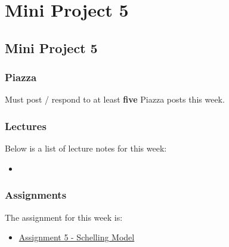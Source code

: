 \clearpage

\renewcommand{\ChapTitle}{Mini Project 5}
\renewcommand{\SectionTitle}{Mini Project 5}

\chapter{\ChapTitle}
\section{\SectionTitle}

\subsection{Piazza}

Must post / respond to at least \textbf{five} Piazza posts this week.

\subsection{Lectures}

\noindent Below is a list of lecture notes for this week:

\begin{itemize}
    \item {}
\end{itemize}

\subsection{Assignments}

The assignment for this week is:

\begin{itemize}
    \item \href{https://github.com/QuantumCompiler/CU/tree/main/CSPB%203702%20-%20Cognitive%20Science/Assignments/Assignment%205%20-%20Schelling%20Model}{Assignment 5 - Schelling Model}
\end{itemize}